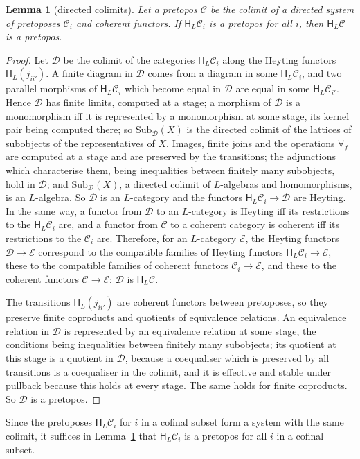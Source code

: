 \documentclass[11pt]{amsart}
\newtheorem{lem}[thm]{Lemma}
\theoremstyle{definition}
\newcommand{\Sub}{\mathrm{Sub}}
\newcommand{\HH}{\mathsf H}
\newcommand{\cC}{\mathcal C}
\newcommand{\cD}{\mathcal D}
\newcommand{\cE}{\mathcal E}
\begin{document}
\begin{lem}[directed colimits]\label{lem:colimit}
Let a pretopos $\cC$ be the colimit of a directed system of pretoposes
$\cC_i$ and coherent functors. If $\HH_L\cC_i$ is a pretopos for all
$i$, then $\HH_L\cC$ is a pretopos.
\end{lem}
\begin{proof}
Let $\cD$ be the colimit of the categories $\HH_L\cC_i$ along the
Heyting functors $\HH_L(j_{ii'})$. A finite diagram in $\cD$ comes from
a diagram in some $\HH_L\cC_i$, and two parallel morphisms of
$\HH_L\cC_i$ which become equal in $\cD$ are equal in some
$\HH_L\cC_{i'}$. Hence $\cD$ has finite limits, computed at a stage; a
morphism of $\cD$ is a monomorphism iff it is represented by a
monomorphism at some stage, its kernel pair being computed there; so
$\Sub_\cD(X)$ is the directed colimit of the lattices of subobjects of
the representatives of $X$. Images, finite joins and the operations
$\forall_f$ are computed at a stage and are preserved by the
transitions; the adjunctions which characterise them, being
inequalities between finitely many subobjects, hold in $\cD$; and
$\Sub_\cD(X)$, a directed colimit of $L$-algebras and homomorphisms,
is an $L$-algebra. So $\cD$ is an $L$-category and the functors
$\HH_L\cC_i\to\cD$ are Heyting. In the same way, a functor from $\cD$
to an $L$-category is Heyting iff its restrictions to the $\HH_L\cC_i$
are, and a functor from $\cC$ to a coherent category is coherent iff
its restrictions to the $\cC_i$ are. Therefore, for an $L$-category
$\cE$, the Heyting functors $\cD\to\cE$ correspond to the compatible
families of Heyting functors $\HH_L\cC_i\to\cE$, these to the
compatible families of coherent functors $\cC_i\to\cE$, and these to
the coherent functors $\cC\to\cE$: $\cD$ is $\HH_L\cC$.

The transitions $\HH_L(j_{ii'})$ are coherent functors between
pretoposes, so they preserve finite coproducts and quotients of
equivalence relations. An equivalence relation in $\cD$ is represented
by an equivalence relation at some stage, the conditions being
inequalities between finitely many subobjects; its quotient at this
stage is a quotient in $\cD$, because a coequaliser which is preserved
by all transitions is a coequaliser in the colimit, and it is
effective and stable under pullback because this holds at every
stage. The same holds for finite coproducts. So $\cD$ is a pretopos.
\end{proof}

Since the pretoposes $\HH_L\cC_i$ for $i$ in a cofinal subset form a
system with the same colimit, it suffices in
Lemma~\ref{lem:colimit} that $\HH_L\cC_i$ is a pretopos for all $i$
in a cofinal subset.
\end{document}
